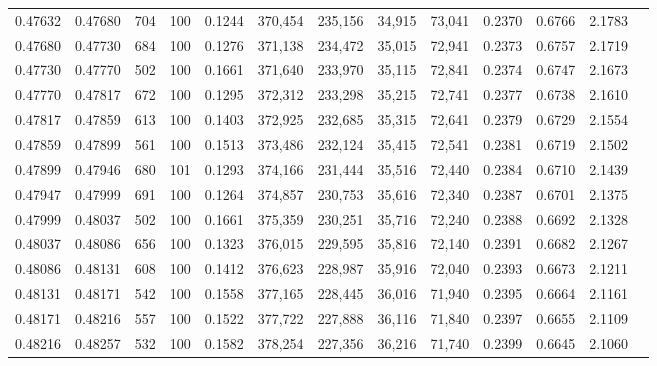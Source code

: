 \begin{tabular}{rrrrrrrrrrrrr}
0.47632 & 0.47680 &   704 & 100 &                                     0.1244 & 370,454 & 235,156 &  34,915 &  73,041 & 0.2370 & 0.6766 & 2.1783 \\
0.47680 & 0.47730 &   684 & 100 &                                     0.1276 & 371,138 & 234,472 &  35,015 &  72,941 & 0.2373 & 0.6757 & 2.1719 \\
0.47730 & 0.47770 &   502 & 100 &                                     0.1661 & 371,640 & 233,970 &  35,115 &  72,841 & 0.2374 & 0.6747 & 2.1673 \\
0.47770 & 0.47817 &   672 & 100 &                                     0.1295 & 372,312 & 233,298 &  35,215 &  72,741 & 0.2377 & 0.6738 & 2.1610 \\
0.47817 & 0.47859 &   613 & 100 &                                     0.1403 & 372,925 & 232,685 &  35,315 &  72,641 & 0.2379 & 0.6729 & 2.1554 \\
0.47859 & 0.47899 &   561 & 100 &                                     0.1513 & 373,486 & 232,124 &  35,415 &  72,541 & 0.2381 & 0.6719 & 2.1502 \\
0.47899 & 0.47946 &   680 & 101 &                                     0.1293 & 374,166 & 231,444 &  35,516 &  72,440 & 0.2384 & 0.6710 & 2.1439 \\
0.47947 & 0.47999 &   691 & 100 &                                     0.1264 & 374,857 & 230,753 &  35,616 &  72,340 & 0.2387 & 0.6701 & 2.1375 \\
0.47999 & 0.48037 &   502 & 100 &                                     0.1661 & 375,359 & 230,251 &  35,716 &  72,240 & 0.2388 & 0.6692 & 2.1328 \\
0.48037 & 0.48086 &   656 & 100 &                                     0.1323 & 376,015 & 229,595 &  35,816 &  72,140 & 0.2391 & 0.6682 & 2.1267 \\
0.48086 & 0.48131 &   608 & 100 &                                     0.1412 & 376,623 & 228,987 &  35,916 &  72,040 & 0.2393 & 0.6673 & 2.1211 \\
0.48131 & 0.48171 &   542 & 100 &                                     0.1558 & 377,165 & 228,445 &  36,016 &  71,940 & 0.2395 & 0.6664 & 2.1161 \\
0.48171 & 0.48216 &   557 & 100 &                                     0.1522 & 377,722 & 227,888 &  36,116 &  71,840 & 0.2397 & 0.6655 & 2.1109 \\
0.48216 & 0.48257 &   532 & 100 &                                     0.1582 & 378,254 & 227,356 &  36,216 &  71,740 & 0.2399 & 0.6645 & 2.1060 \\

\end{tabular}
